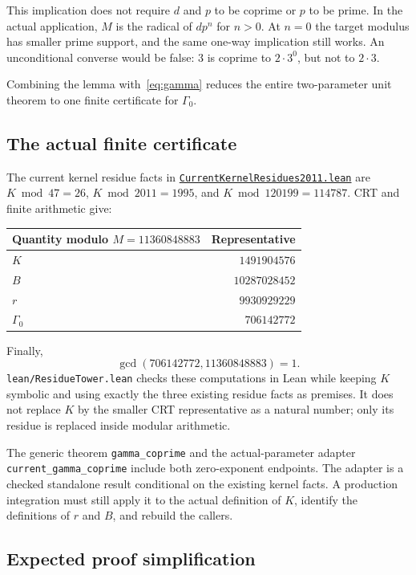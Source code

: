 \documentclass[11pt,letterpaper]{article}
\newcommand{\repobase}{https://github.com/VladimirReshetnikov/ProveIt/blob/9f35798db4a63c25e435fca14d75931144657d7e}
\newcommand{\leanfile}[1]{\href{\repobase/Computability/DiophantineConsistency/Lean/DiophantineConsistency/#1.lean}{\nolinkurl{#1.lean}}}
\newcommand{\ident}[1]{\nolinkurl{#1}}
\newcommand{\artifact}[1]{\nolinkurl{#1}}
\begin{document}
This implication does not require $d$ and $p$ to be coprime or $p$ to be
prime. In the actual application, $M$ is the radical of $dp^n$ for $n>0$.
At $n=0$ the target modulus has smaller prime support, and the same
one-way implication still works. An unconditional converse would be false:
$3$ is coprime to $2\cdot3^0$, but not to $2\cdot3$.

Combining the lemma with~\eqref{eq:gamma} reduces the entire two-parameter
unit theorem to one finite certificate for $\Gamma_0$.

\subsection{The actual finite certificate}

The current kernel residue facts in \leanfile{CurrentKernelResidues2011}
are $K\bmod47=26$, $K\bmod2011=1995$, and
$K\bmod120199=114787$. CRT and finite arithmetic give:

\begin{center}
\begin{tabular}{@{}lr@{}}
\toprule
Quantity modulo $M=11360848883$ & Representative \\
\midrule
$K$ & $1491904576$ \\
$B$ & $10287028452$ \\
$r$ & $9930929229$ \\
$\Gamma_0$ & $706142772$ \\
\bottomrule
\end{tabular}
\end{center}

Finally,
\[
 \gcd(706142772,11360848883)=1.
\]
\artifact{lean/ResidueTower.lean} checks these computations in Lean while
keeping $K$ symbolic and using exactly the three existing residue facts as
premises. It does not replace $K$ by the smaller CRT representative as a
natural number; only its residue is replaced inside modular arithmetic.

The generic theorem \ident{gamma_coprime} and the actual-parameter adapter
\ident{current_gamma_coprime} include both zero-exponent endpoints. The
adapter is a checked standalone result conditional on the existing kernel
facts. A production integration must still apply it to the actual definition
of $K$, identify the definitions of $r$ and $B$, and rebuild the callers.

\subsection{Expected proof simplification}
\end{document}
